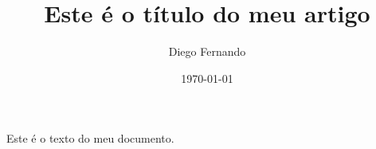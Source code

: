 \documentclass[14pt]{article}
\title{Este é o título do meu artigo}
\author{Diego Fernando}
\date{\today}
\begin{document}
\maketitle
Este é o texto do meu documento.
\end{document}
